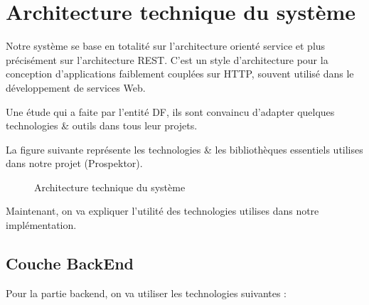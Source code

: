 \section{Architecture technique du syst\`eme}

Notre syst\`eme se base en totalit\'e sur l'architecture orient\'e service et plus pr\'ecis\'ement sur l'architecture \gls{REST}. C'est un style d'architecture pour la conception d'applications faiblement coupl\'ees sur \gls{HTTP}, souvent utilis\'e dans le d\'eveloppement de services Web.

Une \'etude qui a faite par l'entit\'e \gls{DF}, ils sont convaincu d'adapter quelques technologies \& outils dans tous leur projets. 

La figure suivante repr\'esente les technologies \& les biblioth\`eques essentiels utilises dans notre projet (Prospektor).

\begin{figure}[H]
	\caption{\label{fig:my-label} Architecture technique du syst\`eme}
\end{figure}

Maintenant, on va expliquer l'utilit\'e des technologies utilises dans notre impl\'ementation. 

\subsection{Couche BackEnd}

Pour la partie backend, on va utiliser les technologies suivantes :

